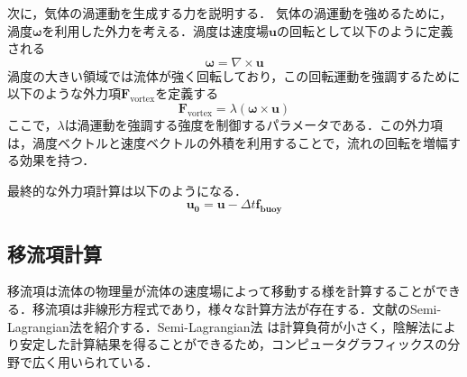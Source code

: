 \documentclass[a4j,12pt]{jreport}
\begin{document}
次に，気体の渦運動を生成する力を説明する．
気体の渦運動を強めるために，渦度$\boldsymbol{\omega}$を利用した外力を考える．渦度は速度場$\mathbf{u}$の回転として以下のように定義される
\[
    \boldsymbol{\omega} = \nabla \times \mathbf{u}
\]
渦度の大きい領域では流体が強く回転しており，この回転運動を強調するために以下のような外力項$\mathbf{F}_{\text{vortex}}$を定義する
\[
    \mathbf{F}_{\text{vortex}} = \lambda (\boldsymbol{\omega} \times \mathbf{u})
\]
ここで，$\lambda$は渦運動を強調する強度を制御するパラメータである．この外力項は，渦度ベクトルと速度ベクトルの外積を利用することで，流れの回転を増幅する効果を持つ．



最終的な外力項計算は以下のようになる．
\begin{equation}
	\bm{u_0} =  \bm{u}  - \varDelta t \bm{f_{buoy}} 
\end{equation} 


\subsection{移流項計算}
移流項は流体の物理量が流体の速度場によって移動する様を計算することができる．移流項は非線形方程式であり，様々な計算方法が存在する．文献\cite{fedkiw}のSemi-Lagrangian法を紹介する．Semi-Lagrangian法
は計算負荷が小さく，陰解法により安定した計算結果を得ることができるため，コンピュータグラフィックスの分野で広く用いられている．
\end{document}
